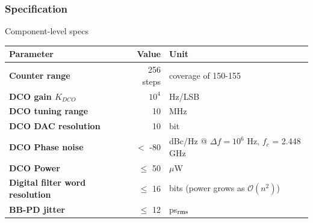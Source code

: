 \documentclass[t, screen, aspectratio=43]{beamer}
\begin{document}
\begin{frame}
	\frametitle{Specification\color{black}}
	\begin{block}{Component-level specs}
		\scriptsize
	\begin{table}[h!]
		\centering
		\tiny
		\def\arraystretch{1.5}		
		\setlength\arrayrulewidth{0.75pt}
		\setlength{\tabcolsep}{1em} %
		\begin{tabular}{|l|r|l|}
			\hline 
			\rule[-1ex]{0pt}{2.5ex} \cellcolor{gray!40}\textbf{Parameter} & \cellcolor{gray!40}\textbf{Value} & \cellcolor{gray!40}\textbf{Unit }\\ 
			\hline 
			\rule[-1ex]{0pt}{2.5ex} \textbf{Counter range}  & 256 steps & coverage of 150-155 \\ 
			\hline 
			\rule[-1ex]{0pt}{2.5ex} \textbf{DCO gain $K_{DCO}$} & $10^4$ & Hz/LSB \\ 
			\hline 
			\rule[-1ex]{0pt}{2.5ex} \textbf{DCO tuning range} & 10 & MHz \\ 
			\hline 
			\rule[-1ex]{0pt}{2.5ex} \textbf{DCO DAC resolution} & 10 & bit \\ 
			\hline 
			\rule[-1ex]{0pt}{2.5ex} \textbf{DCO Phase noise} &$<$ -80 & dBc/Hz @ $\Delta f=10^6$ Hz, $f_c$ = 2.448 GHz \\ 
			\hline 
			\rule[-1ex]{0pt}{2.5ex} \textbf{DCO Power} & $\leq$ 50 & $\mu$W \\ 
			\hline 
			\rule[-1ex]{0pt}{2.5ex} \textbf{Digital filter word resolution} & $\leq$ 16 & bits (power grows as $\mathcal{O}(n^2)$) \\ 
			\hline 
			\rule[-1ex]{0pt}{2.5ex} \textbf{BB-PD jitter} & $\leq$ 12 & ps$_{\textnormal{rms}}$ \\ 
			\hline 
		\end{tabular} 
		\label{design_specs}
	\end{table}   
	\end{block}    
\end{frame}

\end{document}
